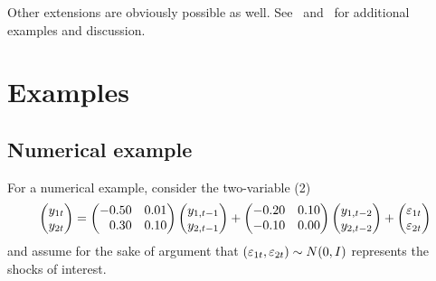 \documentclass[12pt,fleqn]{article}
\begin{document}
Other extensions are obviously possible as well. See~\citet{FRSW:07}
and~\citet{HaS:13} for additional examples and discussion.

\section{Examples}
\label{S3}
\subsection{Numerical example}
\label{S3.1}

For a numerical example, consider the two-variable \VAR(2)
\begin{equation}
  \label{eq:10}
  \begin{pmatrix*}[l]
    y_{1t} \\ y_{2t}
  \end{pmatrix*}
  =
  \begin{pmatrix*}[r]
    - 0.50 & 0.01 \\ 0.30 & 0.10
  \end{pmatrix*}
  \begin{pmatrix*}[l]
    y_{1,t-1} \\ y_{2,t-1}
  \end{pmatrix*}
  +
  \begin{pmatrix*}[r]
    -0.20 & 0.10 \\ -0.10 & 0.00
  \end{pmatrix*}
  \begin{pmatrix*}[l]
    y_{1,t-2} \\ y_{2,t-2}
  \end{pmatrix*}
  +
  \begin{pmatrix*}[l]
    \vep_{1t} \\ \vep_{2t}
  \end{pmatrix*}
\end{equation}
and assume for the sake of argument that $(\varepsilon_{1t},\varepsilon_{2t}) \sim
N(0,I)$ represents the shocks of interest.
\end{document}
